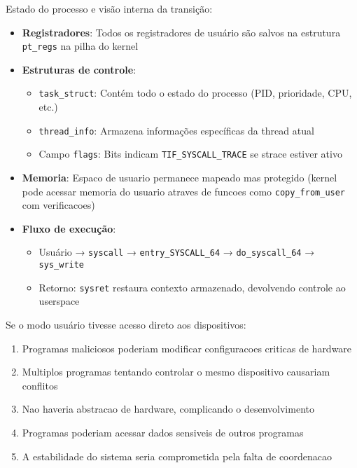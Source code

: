 \documentclass[10pt,a4paper]{article}
\begin{document}
\noindent Estado do processo e visão interna da transição:
\begin{itemize}\setlength\itemsep{0pt}
  \item \textbf{Registradores}: Todos os registradores de usuário são salvos na estrutura \texttt{pt\_regs} na pilha do kernel
  \item \textbf{Estruturas de controle}:
    \begin{itemize}\setlength\itemsep{0pt}
      \item \texttt{task\_struct}: Contém todo o estado do processo (PID, prioridade, CPU, etc.)
      \item \texttt{thread\_info}: Armazena informações específicas da thread atual
      \item Campo \texttt{flags}: Bits indicam \texttt{TIF\_SYSCALL\_TRACE} se strace estiver ativo
    \end{itemize}
  \item \textbf{Memoria}: Espaco de usuario permanece mapeado mas protegido (kernel pode acessar memoria do usuario atraves de funcoes como \texttt{copy\_from\_user} com verificacoes)
  \item \textbf{Fluxo de execução}:
    \begin{itemize}\setlength\itemsep{0pt}
      \item Usuário → \texttt{syscall} → \texttt{entry\_SYSCALL\_64} → \texttt{do\_syscall\_64} → \texttt{sys\_write}
      \item Retorno: \texttt{sysret} restaura contexto armazenado, devolvendo controle ao userspace
    \end{itemize}
\end{itemize}
\vspace{-0.2cm}

Se o modo usuário tivesse acesso direto aos dispositivos:

\begin{enumerate}
  \item Programas maliciosos poderiam modificar configuracoes criticas de hardware
  \item Multiplos programas tentando controlar o mesmo dispositivo causariam conflitos
  \item Nao haveria abstracao de hardware, complicando o desenvolvimento
  \item Programas poderiam acessar dados sensiveis de outros programas
  \item A estabilidade do sistema seria comprometida pela falta de coordenacao
\end{enumerate}
\end{document}
